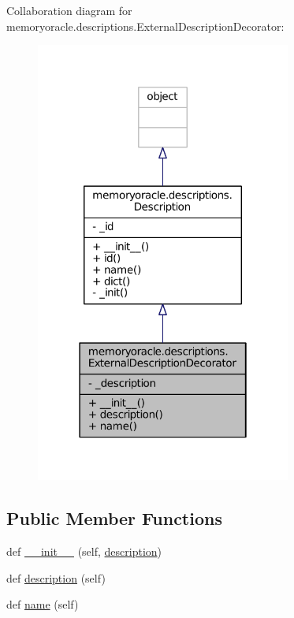 Collaboration diagram for memoryoracle.\+descriptions.\+External\+Description\+Decorator\+:\nopagebreak
\begin{figure}[H]
\begin{center}
\leavevmode
\includegraphics[width=238pt]{classmemoryoracle_1_1descriptions_1_1ExternalDescriptionDecorator__coll__graph}
\end{center}
\end{figure}
\subsection*{Public Member Functions}
\begin{DoxyCompactItemize}
\item 
def \hyperlink{classmemoryoracle_1_1descriptions_1_1ExternalDescriptionDecorator_afeb1f6dd877cc71d89def903ffd781d6}{\+\_\+\+\_\+init\+\_\+\+\_\+} (self, \hyperlink{classmemoryoracle_1_1descriptions_1_1ExternalDescriptionDecorator_ae5952e51de2c9473ce19875b55ccb625}{description})
\item 
def \hyperlink{classmemoryoracle_1_1descriptions_1_1ExternalDescriptionDecorator_ae5952e51de2c9473ce19875b55ccb625}{description} (self)
\item 
def \hyperlink{classmemoryoracle_1_1descriptions_1_1ExternalDescriptionDecorator_a3653b421084fc367f59e1b365270d4e1}{name} (self)
\end{DoxyCompactItemize}
